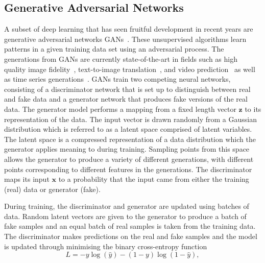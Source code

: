 \documentclass[12pt]{iopart}
\begin{document}
\subsection{Generative Adversarial Networks}
%
%
A subset of deep learning that has seen fruitful development in recent years
are generative adversarial networks \acp{GAN}~\cite{Goodfellow2014}. These unsupervised algorithms learn patterns in a
given training data set using an adversarial process. The generations from
\acp{GAN} are currently state-of-the-art in fields such as high quality image
fidelity~\cite{brock2018large,karras2019analyzing}, text-to-image
translation~\cite{reed2016generative}, and video
prediction~\cite{liang2017dual} as well as time series
generations~\cite{esteban2017realvalued}.
%
%
\acp{GAN} train two competing neural networks, consisting of a discriminator
network that is set up to distinguish between real and fake data and a
generator network that produces fake versions of the real data. The generator model performs a mapping from a fixed length vector $\mathbf{z}$ to its
representation of the data. The input vector is drawn randomly from a Gaussian distribution which is referred to as a latent space comprised of latent variables. The latent space is a compressed representation of a data distribution which the generator applies meaning to during training. Sampling points from this space allows the generator to produce a variety of different generations, with different points corresponding to different features in the generations. The discriminator maps its input $\mathbf{x}$ to a probability that the input came from either the training (real) data or
generator (fake).

%
%
During training, the discriminator and generator are updated using batches of data. Random latent vectors are given to the generator to produce a batch of fake samples and an equal batch of real samples is taken from the training data. The discriminator makes predictions on the real and fake samples and the model is updated through minimising the binary cross-entropy function \cite{Goodfellow-et-al-2016}
%
\begin{equation}
    L = -y \log(\hat{y}) - (1 - y) \log(1-\hat{y}),
    \label{eqn:crossentropy}
\end{equation}
\end{document}
